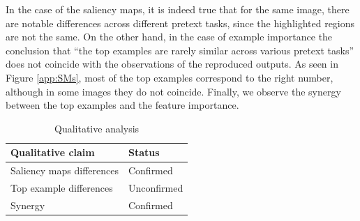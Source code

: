     In the case of the saliency maps, it is indeed true that for the same image, there are notable differences across different pretext tasks, since the highlighted regions are not the same. On the other hand, in the case of example importance the conclusion that \enquote{the top examples are rarely similar across various pretext tasks} does not coincide with the observations of the reproduced outputs. As seen in Figure \ref{app:SMs}, most of the top examples correspond to the right number, although in some images they do not coincide. Finally, we observe the synergy between the top examples and the feature importance. 
    \vspace{-2mm}
    \begin{table}[H]
    \centering
    \label{tab:qualitativeanalysis}
    \begin{tabular}{l|l}
    \hline
     \textbf{Qualitative claim}  & \textbf{Status} \\  
     \hline 
     Saliency maps differences  & Confirmed \\
     Top example differences & Unconfirmed \\
     Synergy   & Confirmed \\           
    \hline
      
\end{tabular}
  \caption{Qualitative analysis}
\end{table}

